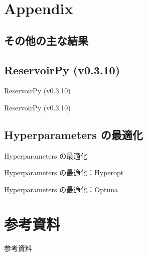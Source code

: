 \section{Appendix}

\subsection{その他の主な結果}
\begin{frame}{}

\end{frame}

\begin{frame}{}

\end{frame}

\begin{frame}{}

\end{frame}

\begin{frame}{}

\end{frame}

\begin{frame}{}

\end{frame}

\subsection{ReservoirPy (v0.3.10)}
\begin{frame}{ReservoirPy (v0.3.10)}

\end{frame}

\begin{frame}{ReservoirPy (v0.3.10)}

\end{frame}

\subsection{Hyperparameters の最適化}
\begin{frame}{Hyperparameters の最適化}

\end{frame}

\begin{frame}{Hyperparameters の最適化：Hyperopt}

\end{frame}

\begin{frame}{Hyperparameters の最適化：Optuna}

\end{frame}

\section{参考資料}
\begin{frame}{参考資料}

\end{frame}

